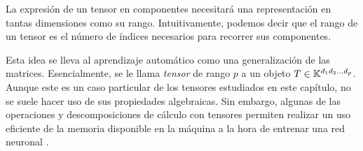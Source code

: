 La expresión de un tensor en componentes necesitará una representación en tantas dimensiones como su rango. Intuitivamente, podemos decir que el rango de un tensor es el número de índices necesarios para recorrer sus componentes.

Esta idea se lleva al aprendizaje automático como una generalización de las matrices. Esencialmente, se le llama \emph{tensor} de rango $p$ a un objeto $T\in \mathbb{K}^{d_1d_2 \dots d_p}$. Aunque este es un caso particular de los tensores estudiados en este capítulo, no se suele hacer uso de sus propiedades algebraicas. Sin embargo, algunas de las operaciones y descomposiciones de cálculo con tensores permiten realizar un uso eficiente de la memoria disponible en la máquina a la hora de entrenar una red neuronal \autocite{kolda2009}.
